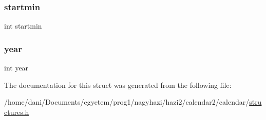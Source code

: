 \subsubsection{\texorpdfstring{startmin}{startmin}}
{\footnotesize\ttfamily int startmin}

\mbox{\label{struct_event_abeac221e38b7b9ce7df8722c842bf671}} 
\subsubsection{\texorpdfstring{year}{year}}
{\footnotesize\ttfamily int year}



The documentation for this struct was generated from the following file\+:\begin{DoxyCompactItemize}
\item 
/home/dani/\+Documents/egyetem/prog1/nagyhazi/hazi2/calendar2/calendar/\hyperlink{structures_8h}{structures.\+h}\end{DoxyCompactItemize}

